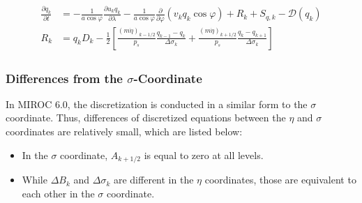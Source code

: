 \begin{eqnarray}
\begin{aligned}
  \frac{\partial q_k}{\partial t}
      &=  - \frac{1}{a\cos\varphi}
               \frac{\partial u_k q_k}{\partial \lambda}
          - \frac{1}{a\cos\varphi}
               \frac{\partial }{\partial \varphi} ( v_k q_k\cos\varphi)
          + R_k
          + S_{q,k}
          - {\mathcal D}(q_k) \\
R_k  &=  q_k D_k
       - \frac{1}{2}
             \left[   \frac{(m\dot{\eta})_{k-1/2}}{p_s} \frac{q_{k-1} - q_k}{\Delta\sigma_k}
               + \frac{(m\dot{\eta})_{k+1/2}}{p_s} \frac{q_k   - q_{k+1}}{\Delta\sigma_k} \right]  \end{aligned}\end{eqnarray}

\hypertarget{differences-from-the-sigma-coordinate}{%
\subsubsection{\texorpdfstring{Differences from the \(\sigma\)-Coordinate}{Differences from the \textbackslash sigma-Coordinate}}\label{differences-from-the-sigma-coordinate}}

In MIROC 6.0, the discretization is conducted in a similar form to the \(\sigma\) coordinate. Thus, differences of discretized equations between the \(\eta\) and \(\sigma\) coordinates are relatively
small, which are listed below:

\begin{itemize}
\item
  In the \(\sigma\) coordinate, \(A_{k+1/2}\) is equal to zero at all levels.
\item
  While \(\Delta B_k\) and \(\Delta \sigma_k\) are different in the \(\eta\) coordinates, those are equivalent to each other in the \(\sigma\) coordinate.
\end{itemize}
